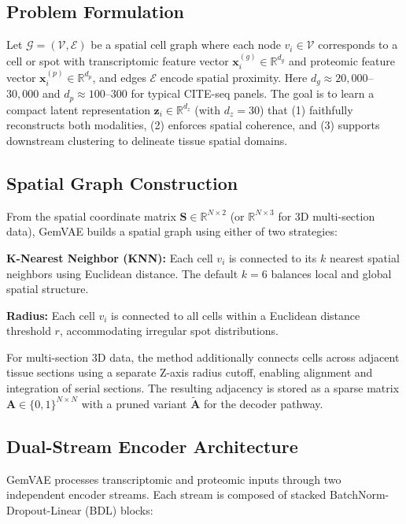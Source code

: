 \documentclass[conference]{IEEEtran}
\begin{document}
\subsection{Problem Formulation}

Let $\mathcal{G} = (\mathcal{V}, \mathcal{E})$ be a spatial cell graph where each node $v_i \in \mathcal{V}$ corresponds to a cell or spot with transcriptomic feature vector $\mathbf{x}_i^{(g)} \in \mathbb{R}^{d_g}$ and proteomic feature vector $\mathbf{x}_i^{(p)} \in \mathbb{R}^{d_p}$, and edges $\mathcal{E}$ encode spatial proximity. Here $d_g \approx 20{,}000$--$30{,}000$ and $d_p \approx 100$--$300$ for typical CITE-seq panels. The goal is to learn a compact latent representation $\mathbf{z}_i \in \mathbb{R}^{d_z}$ (with $d_z = 30$) that (1) faithfully reconstructs both modalities, (2) enforces spatial coherence, and (3) supports downstream clustering to delineate tissue spatial domains.

\subsection{Spatial Graph Construction}

From the spatial coordinate matrix $\mathbf{S} \in \mathbb{R}^{N \times 2}$ (or $\mathbb{R}^{N \times 3}$ for 3D multi-section data), GemVAE builds a spatial graph using either of two strategies:

\textbf{K-Nearest Neighbor (KNN):} Each cell $v_i$ is connected to its $k$ nearest spatial neighbors using Euclidean distance. The default $k=6$ balances local and global spatial structure.

\textbf{Radius:} Each cell $v_i$ is connected to all cells within a Euclidean distance threshold $r$, accommodating irregular spot distributions.

For multi-section 3D data, the method additionally connects cells across adjacent tissue sections using a separate Z-axis radius cutoff, enabling alignment and integration of serial sections. The resulting adjacency is stored as a sparse matrix $\mathbf{A} \in \{0,1\}^{N \times N}$ with a pruned variant $\tilde{\mathbf{A}}$ for the decoder pathway.

\subsection{Dual-Stream Encoder Architecture}

GemVAE processes transcriptomic and proteomic inputs through two independent encoder streams. Each stream is composed of stacked BatchNorm-Dropout-Linear (BDL) blocks:
\end{document}
